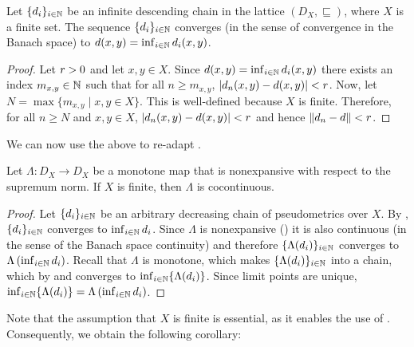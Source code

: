 \begin{lemma}\label{c2:lem:chain_conv_to_inf}
    Let $\{d_i\}_{i \in \mathbb{N}}$ be an infinite descending chain in the lattice $(D_X, \sqsubseteq)$, where $X$ is a finite set. The sequence $\{d_i\}_{i \in \mathbb{N}}$ converges (in the sense of convergence in the Banach space) to $d(x,y) = \inf_{i \in \mathbb{N}} d_i(x,y)$.
\end{lemma}
\begin{proof}
     Let $r > 0$ and let $x, y \in X$. Since $d(x,y) = \inf_{i \in \mathbb{N}} d_i(x,y)$ 
    there exists an index $m_{x,y} \in \mathbb{N}$ such that for all $n \geq m_{x,y}$, $|d_n(x,y) - d(x,y)| < r$. Now, let $N = \max \{m_{x,y} \mid x, y \in X\}$. This is well-defined because $X$ is finite. Therefore, for all $n \geq N$ and $x,y \in X$, $| d_n(x,y) - d(x,y)|< r$ and hence $\| d_n - d\| < r$.
\end{proof}
We can now use the above to re-adapt \cite[Theorem~1]{Breugel:2012:On}. 
\begin{lemma}
	Let $\Lambda \colon D_X \to D_X$ be a monotone map that is nonexpansive with respect to the supremum norm. If $X$ is finite, then $\Lambda$ is cocontinuous.
\end{lemma}
\begin{proof}
Let $\{d_i\}_{i \in \mathbb{N}}$ be an arbitrary decreasing chain of pseudometrics over $X$. By , $\{d_i\}_{i \in \mathbb{N}}$ converges to $\inf_{i \in \mathbb{N}} d_i$. Since $\Lambda$ is nonexpansive () it is also continuous (in the sense of the Banach space continuity) and therefore $\{\Lambda(d_i)\}_{i \in \mathbb{N}}$ converges to $\Lambda \left(\inf_{i \in \mathbb{N}} d_i\right)$. 
 Recall that $\Lambda$ is monotone, which makes $\{\Lambda(d_i)\}_{i \in \mathbb{N}}$ into a chain, which by  and  converges to $\inf_{i \in \mathbb{N}} \{\Lambda (d_i)\}$. 
 Since limit points are unique, $\inf_{i \in \mathbb{N}} \{\Lambda (d_i)\} = \Lambda \left(\inf_{i \in \mathbb{N}} d_i\right)$.
\end{proof}
Note that the assumption that $X$ is finite is essential, as it enables the use of . Consequently, we obtain the following corollary:

